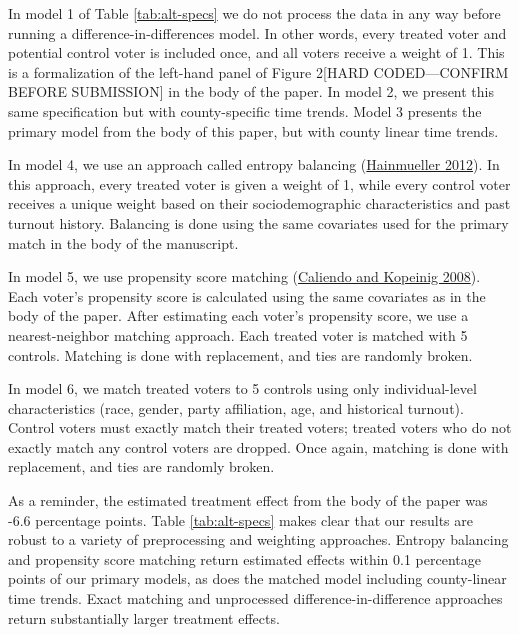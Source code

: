 \documentclass[
  12pt,
]{article}
\begin{document}
In model 1 of Table \ref{tab:alt-specs} we do not process the data in any way before running a difference-in-differences model. In other words, every treated voter and potential control voter is included once, and all voters receive a weight of 1. This is a formalization of the left-hand panel of Figure 2{[}HARD CODED---CONFIRM BEFORE SUBMISSION{]} in the body of the paper. In model 2, we present this same specification but with county-specific time trends. Model 3 presents the primary model from the body of this paper, but with county linear time trends.

In model 4, we use an approach called entropy balancing (\protect\hyperlink{ref-Hainmueller2012}{Hainmueller 2012}). In this approach, every treated voter is given a weight of 1, while every control voter receives a unique weight based on their sociodemographic characteristics and past turnout history. Balancing is done using the same covariates used for the primary match in the body of the manuscript.

In model 5, we use propensity score matching (\protect\hyperlink{ref-Caliendo2008}{Caliendo and Kopeinig 2008}). Each voter's propensity score is calculated using the same covariates as in the body of the paper. After estimating each voter's propensity score, we use a nearest-neighbor matching approach. Each treated voter is matched with 5 controls. Matching is done with replacement, and ties are randomly broken.

In model 6, we match treated voters to 5 controls using only individual-level characteristics (race, gender, party affiliation, age, and historical turnout). Control voters must exactly match their treated voters; treated voters who do not exactly match any control voters are dropped. Once again, matching is done with replacement, and ties are randomly broken.

As a reminder, the estimated treatment effect from the body of the paper was -6.6 percentage points. Table \ref{tab:alt-specs} makes clear that our results are robust to a variety of preprocessing and weighting approaches. Entropy balancing and propensity score matching return estimated effects within 0.1 percentage points of our primary models, as does the matched model including county-linear time trends. Exact matching and unprocessed difference-in-difference approaches return substantially larger treatment effects.

\begin{singlespace}

\end{singlespace}
\end{document}
